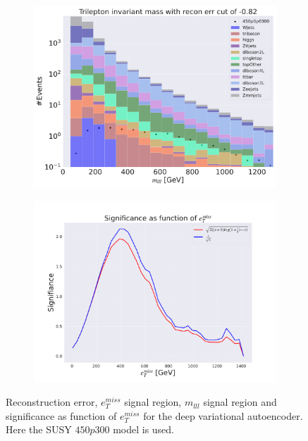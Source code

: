 \begin{figure}[H]
\begin{subfigure}{.40\textwidth}
        \caption{}
        \label{fig:VAE_3lep_big_etmiss_450_2}
    \end{subfigure}
    \hfill
    \begin{subfigure}{.40\textwidth}
        \includegraphics[width=\textwidth]{Figures/VAE_testing/big/3lep/b_data_recon_big_rm3_feats_sig_450p0p0300_mlll_recon_errcut_-0.82.pdf}
        \caption{}
        \label{fig:VAE_3lep_big_mlll_450_2}
    \end{subfigure}
    \hfill   
    \begin{subfigure}{.40\textwidth}
        \includegraphics[width=\textwidth]{Figures/VAE_testing/big/3lep/significance_etmiss_450p0p0300_-0.8226861536678497.pdf}
        \caption{}
        \label{fig:VAE_3lep_big_signi_450_2}
    \end{subfigure}
    \hfill      
    \caption[3lep deep network | $450p300$ | VAE | 2]{Reconstruction error, $e_T^{miss}$ signal region, $m_{lll}$ signal region and significance as function of 
    $e_T^{miss}$ for the deep variational autoencoder. Here the SUSY $450p300$ model is used.}
    \label{fig:VAE_3lep_big_rec_sig_signi_450_2}
\end{figure}

